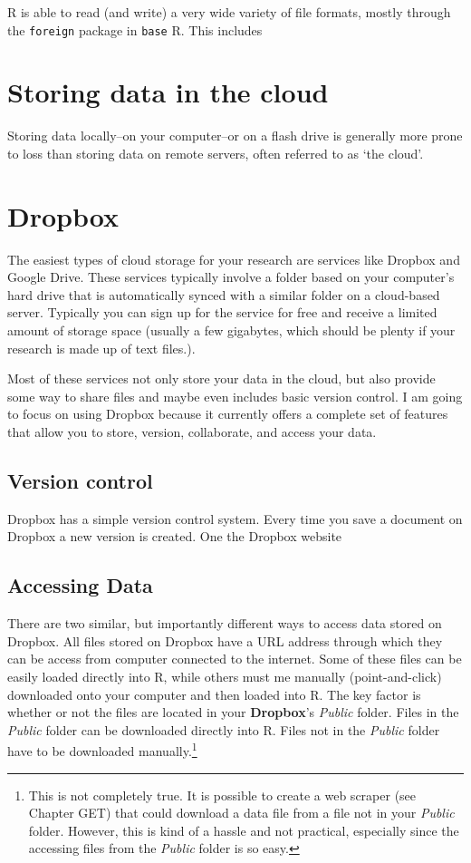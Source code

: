 \documentclass[ChapterTOCs,krantz1]{krantz}\usepackage{graphicx, color}
\begin{document}
R is able to read (and write) a very wide variety of file
formats, mostly through the \texttt{foreign} package in \texttt{base}
R. This includes

\section{Storing data in the cloud}

Storing data locally--on your computer--or on a flash drive is generally
more prone to loss than storing data on remote servers, often referred
to as `the cloud'.

\section{Dropbox}

The easiest types of cloud storage for your research are services like
Dropbox and Google Drive. These services typically
involve a folder based on your computer's hard drive that is
automatically synced with a similar folder on a cloud-based server.
Typically you can sign up for the service for free and receive a limited
amount of storage space (usually a few gigabytes, which should be plenty
if your research is made up of text files.).

Most of these services not only store your data in the cloud, but also
provide some way to share files and maybe even includes basic version
control. I am going to focus on using Dropbox because it
currently offers a complete set of features that allow you to store,
version, collaborate, and access your data.

\subsection{Version control}

Dropbox has a simple version control system. Every time you
save a document on Dropbox a new version is created. One the
Dropbox website

\subsection{Accessing Data}

There are two similar, but importantly different ways to access data
stored on Dropbox. All files stored on Dropbox have a
URL address through which they can be access from computer connected to
the internet. Some of these files can be easily loaded directly into
R, while others must me manually (point-and-click) downloaded
onto your computer and then loaded into R. The key factor is
whether or not the files are located in your \textbf{Dropbox}'s
\emph{Public} folder. Files in the \emph{Public} folder can be
downloaded directly into R. Files not in the \emph{Public} folder
have to be downloaded manually.\footnote{This is not completely true. It
  is possible to create a web scraper (see Chapter GET) that could
  download a data file from a file not in your \emph{Public} folder.
  However, this is kind of a hassle and not practical, especially since
  the accessing files from the \emph{Public} folder is so easy.}
\end{document}
